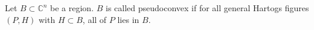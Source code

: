 Let $B \subset \mathbb{C}^n$ be a region. $B$ is called pseudoconvex if for all general Hartogs figures $(P, H)$ with $H \subset B$, all of $P$ lies in $B$.
